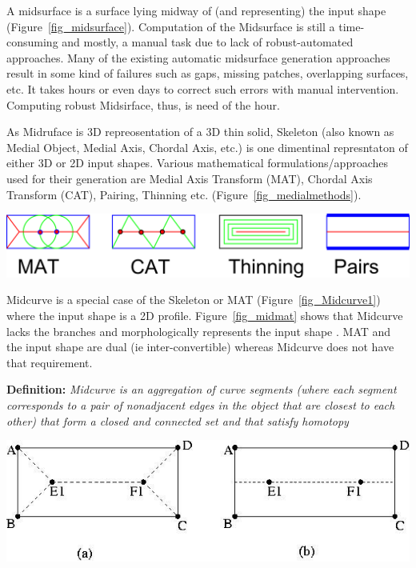 \documentclass[9pt,academicons]{article}
\begin{document}
A midsurface is a surface lying midway of (and representing) the input shape (Figure~\ref{fig_midsurface}).  Computation of the Midsurface is still a time-consuming and mostly, a manual task due to lack of robust-automated approaches. Many of the existing automatic midsurface generation approaches result in some kind of failures such as gaps, missing patches, overlapping surfaces, etc. It takes hours or even days to correct such errors with manual intervention. Computing robust Midsirface, thus, is need of the hour.


	
	
As Midruface is 3D repreosentation of a 3D thin solid, Skeleton (also known as Medial Object, Medial Axis, Chordal Axis, etc.) is one dimentinal represntaton of either 3D or 2D input shapes. Various mathematical formulations/approaches used for their generation are Medial Axis Transform (MAT), Chordal Axis Transform (CAT), Pairing, Thinning etc. (Figure~\ref{fig_medialmethods}). 

    \begin{center}
	\includegraphics[width=0.6\linewidth]{images/MedialMethodsOnlyShort}
	\label{fig_medialmethods}
    \end{center}
		
Midcurve is a special case of the Skeleton or MAT (Figure~\ref{fig_Midcurve1}) where the input shape is a 2D profile. Figure~\ref{fig_midmat} shows that Midcurve lacks the branches and morphologically represents the input shape \cite{Ramanathan04}. MAT and the input shape are dual (ie inter-convertible) whereas Midcurve does not have that requirement.

{\bf Definition:} \textit{Midcurve is an aggregation of curve segments (where each segment corresponds to a pair of nonadjacent edges in the object that are closest to each other) that form a closed and connected set and that satisfy homotopy}


    \begin{center}
	\includegraphics[width=0.5\linewidth]{images/Medial-Axis-and-Mid-curve_W640}
	\label{fig_midmat}
    \end{center}
		
\end{document}
